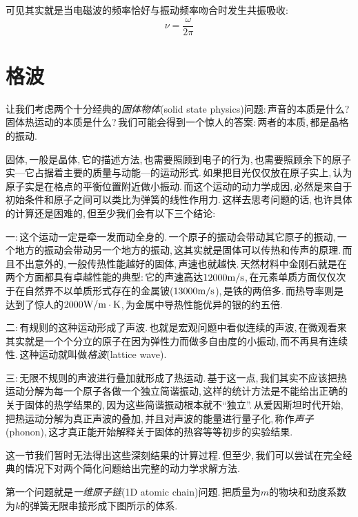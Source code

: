 可见其实就是当电磁波的频率恰好与振动频率吻合时发生共振吸收:
\[\nu=\frac{\omega}{2\pi}\]
\newpage



\section{格波}

让我们考虑两个十分经典的\emph{固体物体}(solid state physics)问题:\,声音的本质是什么?\,固体热运动的本质是什么?\,我们可能会得到一个惊人的答案:\,两者的本质,\,都是晶格的振动.

固体,\,一般是晶体,\,它的描述方法,\,也需要照顾到电子的行为,\,也需要照顾余下的原子实---它占据着主要的质量与动能---的运动形式.\,如果把目光仅仅放在原子实上,\,认为原子实是在格点的平衡位置附近做小振动.\,而这个运动的动力学成因,\,必然是来自于初始条件和原子之间可以类比为弹簧的线性作用力.\,这样去思考问题的话,\,也许具体的计算还是困难的,\,但至少我们会有以下三个结论:

一:\,这个运动一定是牵一发而动全身的.\,一个原子的振动会带动其它原子的振动,\,一个地方的振动会带动另一个地方的振动,\,这其实就是固体可以传热和传声的原理.\,而且不出意外的,\,一般传热性能越好的固体,\,声速也就越快.\,天然材料中金刚石就是在两个方面都具有卓越性能的典型:\,它的声速高达$12000{\rm m/s}$,\,在元素单质方面仅仅次于在自然界不以单质形式存在的金属铍($13000{\rm m/s}$),\,是铁的两倍多.\,而热导率则是达到了惊人的$2000{\rm W/m\cdot K}$,\,为金属中导热性能优异的银的约五倍.

二:\,有规则的这种运动形成了声波.\,也就是宏观问题中看似连续的声波,\,在微观看来其实就是一个个分立的原子在因为弹性力而做多自由度的小振动,\,而不再具有连续性.\,这种运动就叫做\emph{格波}(lattice wave).

三:\,无限不规则的声波进行叠加就形成了热运动.\,基于这一点,\,我们其实不应该把热运动分解为每一个原子各做一个独立简谐振动,\,这样的统计方法是不能给出正确的关于固体的热学结果的,\,因为这些简谐振动根本就不``独立''.\,从爱因斯坦时代开始,\,把热运动分解为真正声波的叠加,\,并且对声波的能量进行量子化,\,称作\emph{声子}(phonon),\,这才真正能开始解释关于固体的热容等等初步的实验结果.

这一节我们暂时无法得出这些深刻结果的计算过程.\,但至少,\,我们可以尝试在完全经典的情况下对两个简化问题给出完整的动力学求解方法.

第一个问题就是\emph{一维原子链}(1D atomic chain)问题.\,把质量为$m$的物块和劲度系数为$k$的弹簧无限串接形成下图所示的体系.

